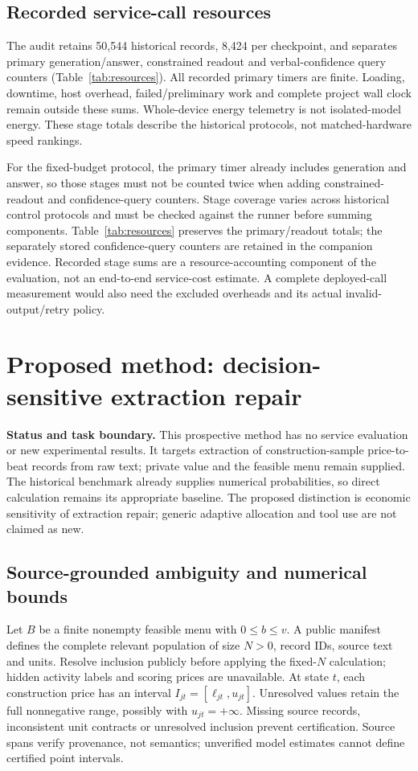 \documentclass[sigconf,anonymous,nonacm]{acmart}
\begin{document}
\subsection{Recorded service-call resources}\label{sec:callresources}
The audit retains 50,544 historical records, 8,424 per checkpoint, and separates primary generation/answer, constrained readout and verbal-confidence query counters (Table~\ref{tab:resources}). All recorded primary timers are finite. Loading, downtime, host overhead, failed/preliminary work and complete project wall clock remain outside these sums. Whole-device energy telemetry is not isolated-model energy. These stage totals describe the historical protocols, not matched-hardware speed rankings.

For the fixed-budget protocol, the primary timer already includes generation and answer, so those stages must not be counted twice when adding constrained-readout and confidence-query counters. Stage coverage varies across historical control protocols and must be checked against the runner before summing components. Table~\ref{tab:resources} preserves the primary/readout totals; the separately stored confidence-query counters are retained in the companion evidence. Recorded stage sums are a resource-accounting component of the evaluation, not an end-to-end service-cost estimate. A complete deployed-call measurement would also need the excluded overheads and its actual invalid-output/retry policy.

\section{Proposed method: decision-sensitive extraction repair}\label{sec:selectiverepair}
\textbf{Status and task boundary.} This prospective method has no service evaluation or new experimental results. It targets extraction of construction-sample price-to-beat records from raw text; private value and the feasible menu remain supplied. The historical benchmark already supplies numerical probabilities, so direct calculation remains its appropriate baseline. The proposed distinction is economic sensitivity of extraction repair; generic adaptive allocation and tool use are not claimed as new.

\subsection{Source-grounded ambiguity and numerical bounds}
Let $B$ be a finite nonempty feasible menu with $0\leq b\leq v$. A public manifest defines the complete relevant population of size $N>0$, record IDs, source text and units. Resolve inclusion publicly before applying the fixed-$N$ calculation; hidden activity labels and scoring prices are unavailable. At state $t$, each construction price has an interval $I_{jt}=[\ell_{jt},u_{jt}]$. Unresolved values retain the full nonnegative range, possibly with $u_{jt}=+\infty$. Missing source records, inconsistent unit contracts or unresolved inclusion prevent certification. Source spans verify provenance, not semantics; unverified model estimates cannot define certified point intervals.
\end{document}
